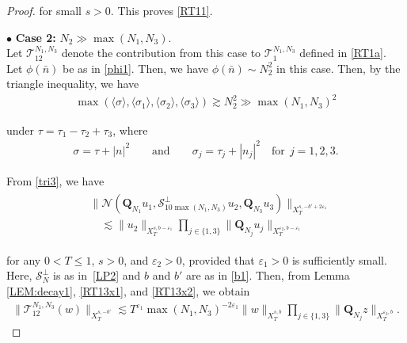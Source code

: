 \documentclass[%
11pt,  reqno]{amsart}
\newcommand{\1}{\hspace{0.2mm}\text{I}\hspace{0.2mm}}
\newcommand{\noi}{\noindent}
\newcommand{\Q}{\mathbf{Q}}
\newcommand{\Sb}{\pmb{\mathcal{S}}}
\newcommand{\eps}{\varepsilon}
\newcommand{\s}{\sigma}
\newcommand{\les}{\lesssim}
\newcommand{\ges}{\gtrsim}
\newcommand{\jb}[1]
{\langle #1 \rangle}
\newcommand{\NN}{\mathcal{N}}
\numberwithin{equation}{section}
\numberwithin{theorem}{section}
\newcommand{\TT}{\mathcal{T}}
\begin{document}
\begin{proof}
\noi
\noi 
for small $s >  0$.
This proves \eqref{RT11}.



\medskip

\noi 
$\bullet$ {\bf Case 2:}
 $N_2 \gg \max (N_1, N_3)$. 
\\
\indent
Let $\TT_{12}^{N_1,N_3}$ denote the contribution
from this case 
to $\TT_{1}^{N_1,N_3}$ defined in \eqref{RT1a}.
Let $\phi(\bar n)$ be as in \eqref{phi1}.
Then, we have 
$\phi (\bar n) \sim N_2^2$
in this case.
%
%
%
%
Then, by the triangle inequality, 
we have 
\begin{align}
\max (\jb{\s}, \jb{\s_1},\jb{\s_2}, \jb{\s_3}) \ges N_2^{2}\gg 
\max (N_1, N_3)^2
\label{RT13x1}
\end{align}

\noi
under $\tau = \tau_1 - \tau_2 + \tau_3$, 
where 
\begin{align}
\s = \tau + |n|^2
\qquad \text{and} \qquad \s_j = \tau_j + |n_j|^2\quad  \text{for}\ \  j = 1,2,3.
\label{mod1}
\end{align}



\noi
From \eqref{tri3}, we have 
\begin{align}
\begin{split}
& \big\|
\NN(\Q_{N_1} u_1,
  \Sb^\perp_{10 \max (N_1, N_3)}u_2,   \Q_{N_3}u_3)\big\|_{X^{s, - b' + 2\eps_1 }_T} \\
& \quad %
\les 
\|u_2\|_{X^{s, b-\eps_1}_T}
 \prod_{j \in \{1, 3\} } \|\Q_{N_j} u_j\|_{X^{\eps_2, b - \eps_1}_T}
\end{split}
\label{RT13x2}
\end{align}

\noi
for any  $0 < T \le 1$, $s > 0$,  and $\eps_2 > 0$, 
provided that $\eps_1 > 0$ is sufficiently small.
Here, $\Sb^\perp_N$ is as in~\eqref{LP2} and $b$ and $b'$ are as in \eqref{b1}.
Then, from Lemma \ref{LEM:decay1}, \eqref{RT13x1},  and \eqref{RT13x2}, 
we obtain 
\begin{align*}
\|\TT_{12}^{N_1,N_3}(w)\|_{X^{s, - b'}_T}
\les T^{\eps_1} \max (N_1, N_3)^{-2\eps_1}
\|w\|_{X^{s, b}_T}
 \prod_{j \in \{1, 3\} } \|\Q_{N_j} z\|_{X^{\eps_2, b }_T}.
\end{align*}



\end{proof}
\end{document}
